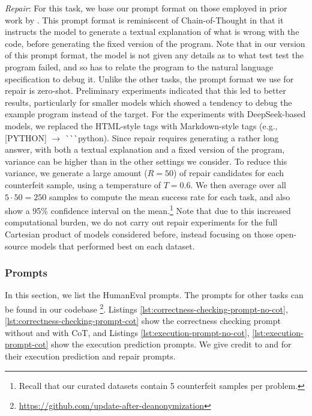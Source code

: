 \textit{Repair}: For this task, we base our prompt format on those employed in prior work by \citet{olausson2024repair}.
This prompt format is reminiscent of Chain-of-Thought in that it instructs the model to generate a textual explanation of what is wrong with the code, before generating the fixed version of the program.
Note that in our version of this prompt format, the model is not given any details as to what test test the program failed, and so has to relate the program to the natural language specification to debug it.
Unlike the other tasks, the prompt format we use for repair is zero-shot. 
Preliminary experiments indicated that this led to better results, particularly for smaller models which showed a tendency to debug the example program instead of the target. For the experiments with DeepSeek-based models, we replaced the HTML-style tags with Markdown-style tags (e.g., [PYTHON] $\to$ \`{}\`{}\`{}python).
Since repair requires generating a rather long answer, with both a textual explanation and a fixed version of the program, variance can be higher than in the other settings we consider.
To reduce this variance, we generate a large amount ($R=50$) of repair candidates for each counterfeit sample, using a temperature of $T=0.6$. We then average over all $5 \cdot 50 = 250$ samples to compute the mean success rate for each task, and also show a 95\% confidence interval on the mean.\footnote{Recall that our curated datasets contain 5 counterfeit samples per problem.}
Note that due to this increased computational burden, we do not carry out repair experiments for the full Cartesian product of models considered before, instead focusing on those open-source models that performed best on each dataset.

\subsubsection{Prompts}
\label{sec:prompts}
In this section, we list the HumanEval prompts. The prompts for other tasks can be found in our codebase \footnote{\url{https://github.com/update-after-deanonymization}}. Listings \ref{lst:correctness-checking-prompt-no-cot}, \ref{lst:correctness-checking-prompt-cot} show the correctness checking prompt without and with CoT, and Listings \ref{lst:execution-prompt-no-cot}, \ref{lst:execution-prompt-cot} show the execution prediction prompts. We give credit to \citet{gu2024cruxeval} and \citet{olausson2024repair} for their execution prediction and repair prompts.

